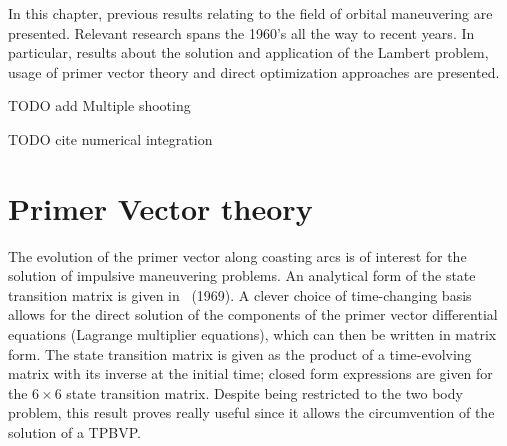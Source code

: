 
In this chapter, previous results relating to the field of orbital maneuvering are presented. Relevant research spans the 1960's all the way to recent years. In particular, results about the solution and application of the Lambert problem, usage of primer vector theory and direct optimization approaches are presented.

TODO add Multiple shooting

TODO cite numerical integration




\section{Primer Vector theory}

The evolution of the primer vector along coasting arcs is of interest for the solution of impulsive maneuvering problems. An analytical form of the state transition matrix is given in~\citeauthor{glandorf_transition_matrix} (1969). A clever choice of time-changing basis allows for the direct solution of the components of the primer vector differential equations (Lagrange multiplier equations), which can then be written in matrix form. The state transition matrix is given as the product of a time-evolving matrix with its inverse at the initial time; closed form expressions are given for the \(6\times6\) state transition matrix. Despite being restricted to the two body problem, this result proves really useful since it allows the circumvention of the solution of a TPBVP.

